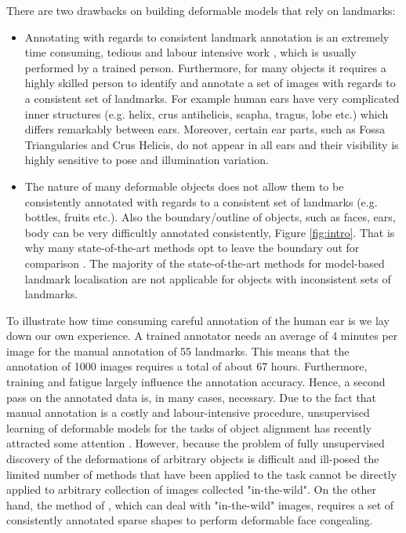 There are two drawbacks on building deformable models that rely on landmarks: 
\begin{itemize}

\item Annotating with regards to consistent landmark annotation is an extremely time consuming, tedious and labour intensive work \cite{sagonas_iccv_300w_2013}, which is usually performed by a trained person. Furthermore, for many objects it requires a highly skilled person to identify and annotate a set of images with regards to a consistent set of landmarks. For example human ears have very complicated inner structures (e.g. helix, crus antihelicis, scapha, tragus, lobe etc.) which differs remarkably between ears. Moreover, certain ear parts, such as  Fossa Triangularies and Crus Helicis, do not appear in all ears and  their visibility is highly sensitive to pose and illumination variation.

\item The nature of many deformable objects does not allow them to be consistently annotated with regards to a consistent set of landmarks (e.g. bottles, fruits etc.). Also the boundary/outline of objects, such as faces, ears, body can be very difficultly annotated consistently, Figure \ref{fig:intro}. That is why many state-of-the-art methods opt to leave the boundary out for comparison \cite{Tzimiropoulos2014, Asthana2014}. The majority of the state-of-the-art methods for model-based landmark localisation \cite{Cao2012, Zhu2012, Xiong2013, Tzimiropoulos2014, Asthana2014} are not applicable for objects with inconsistent sets of landmarks. 

\end{itemize}

To illustrate how time consuming careful annotation of the human ear is we lay down our own experience. A trained annotator needs an average of 4 minutes per image for the manual annotation of 55 landmarks. This means that the annotation of 1000 images requires a total of about 67 hours. Furthermore,  training and fatigue largely influence the annotation accuracy. Hence, a second pass on the annotated data is, in many cases, necessary. Due to the fact that manual annotation is a costly and labour-intensive procedure, unsupervised learning of deformable models for the tasks of object alignment has recently attracted some attention \cite{frey2003learning, baker2004automatic, cootes2004groupwise, jojic2006escaping, Huang2006, kokkinos2007unsupervised, jiang2009learning, liu2009simultaneous, Zhang2012}. However, because the problem of fully unsupervised discovery of the deformations of arbitrary objects is difficult and ill-posed the limited number of methods that have been applied to the task cannot be directly applied to arbitrary collection of images collected "in-the-wild". On the other hand, the method of \cite{antonakos2014automatic}, which can deal with "in-the-wild" images, requires a set of consistently annotated sparse shapes to perform deformable face congealing. 


